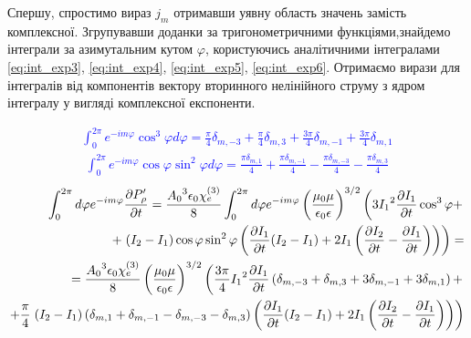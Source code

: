 Спершу, спростимо вираз $ j_m $ отримавши уявну область 
значень замість комплексної. Згрупувавши доданки за тригонометричними 
функціями,знайдемо інтеграли за азимутальним кутом $ \varphi $, 
користуючись аналітичними інтегралами \eqref{eq:int_exp3}, 
\eqref{eq:int_exp4}, \eqref{eq:int_exp5}, \eqref{eq:int_exp6}. Отримаємо 
вирази для інтегралів від компонентів вектору вторинного нелінійного струму 
з ядром інтегралу у вигляді комплексної експоненти.

\textcolor{blue} { \begin{equation*} \begin{aligned}
\int_0^{2\pi} e^{-i m \varphi} \cos^3 \varphi d \varphi = 
\frac{\pi}{4} \delta_{m,-3} + \frac{\pi}{4} \delta_{m,3} + 
\frac{3 \pi}{4} \delta_{m,-1} + \frac{3 \pi}{4} \delta_{m,1}
\end{aligned} \end{equation*} }
%
\textcolor{blue} { \begin{equation*} \begin{aligned}
\int_0^{2\pi} e^{-i m \varphi} \cos \varphi \sin^2 \varphi d \varphi = 
\frac{\pi \delta_{m,1} }{4} + \frac{\pi \delta_{m,-1} }{4} - 
\frac{\pi \delta_{m,-3} }{4} - \frac{\pi \delta_{m,3} }{4}
\end{aligned} \end{equation*} }
%
\textcolor{blue} { \begin{equation*} \begin{aligned}
\int_{0}^{2 \pi} d \varphi e^{-im \varphi} \frac{\partial P_\rho^\prime}{\partial t} = 
\frac{ {A_0}^3 \epsilon_0 \chi_e^{(3)} }{ 8 } \int_{0}^{2\pi} d \varphi
e^{-im\varphi} \left( \frac{\mu_0 \mu} {\epsilon_0 \epsilon} \right)^{3/2} 
\left( 3 {I_1}^2 \frac{\partial I_1}{\partial t} \cos^3 \varphi + \right. \\
+ \left. ( I_2 - I_1 ) \cos \varphi \sin^2 \varphi \left( 
\frac{\partial I_1}{\partial t} ( I_2 - I_1 ) + 2 I_1 \left( \frac{\partial I_2}{\partial t} - 
\frac{\partial I_1}{\partial t} \right) \right) \right) = \\
= \frac{ {A_0}^3 \epsilon_0 \chi_e^{(3)} }{ 8 } 
\left( \frac{\mu_0 \mu} {\epsilon_0 \epsilon} \right)^{3/2}
\left( \frac{3 \pi}{4} {I_1}^2 \frac{\partial I_1}{\partial t} \left( \delta_{m,-3} + 
\delta_{m,3} + 3 \delta_{m,-1} + 3 \delta_{m,1} \right) + \right. \\
+ \frac{\pi }{4} \left. ( I_2 - I_1 ) \left( \delta_{m,1} + 
\delta_{m,-1} - \delta_{m,-3} - \delta_{m,3} \right) \left( 
\frac{\partial I_1}{\partial t} ( I_2 - I_1 ) + 2 I_1 \left( \frac{\partial I_2}{\partial t} - 
\frac{\partial I_1}{\partial t} \right) \right) \right)
\end{aligned} \end{equation*} }
